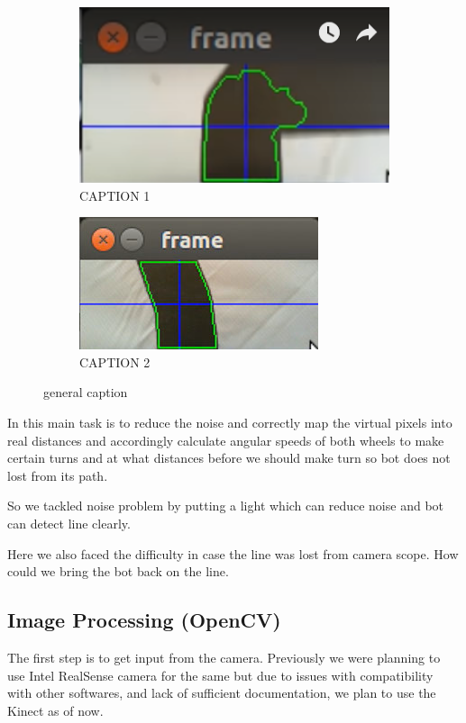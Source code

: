 \documentclass[11pt]{article}
\begin{document}
\begin{figure}[!htb]
\centering
\begin{subfigure}{.5\textwidth}
  \centering
  \includegraphics[width=.8\linewidth]{line_follow1.png}
  \caption{CAPTION 1}
  \label{fig:sub1}
\end{subfigure}%
\begin{subfigure}{.5\textwidth}
  \centering
  \includegraphics[width=.8\linewidth]{line_follow2.png}
  \caption{CAPTION 2}
  \label{fig:sub2}
\end{subfigure}
\caption{general caption}
\label{fig:test}
\end{figure}

In this main task is to reduce the noise and correctly map the virtual pixels into real distances and accordingly calculate angular speeds of both wheels to make certain turns and at what distances before we should  make turn so bot does not lost from its path.

So we tackled noise problem by putting a light which can reduce noise and bot can detect line clearly.

Here we also faced the difficulty in case the line was lost from camera scope. How could we bring the bot back on the line.

\subsection{Image Processing (OpenCV)}
The first step is to get input from the camera. Previously we were planning to use Intel RealSense camera for the same but due to issues with compatibility with other softwares, and lack of sufficient documentation, we plan to use the Kinect as of now.
\end{document}
